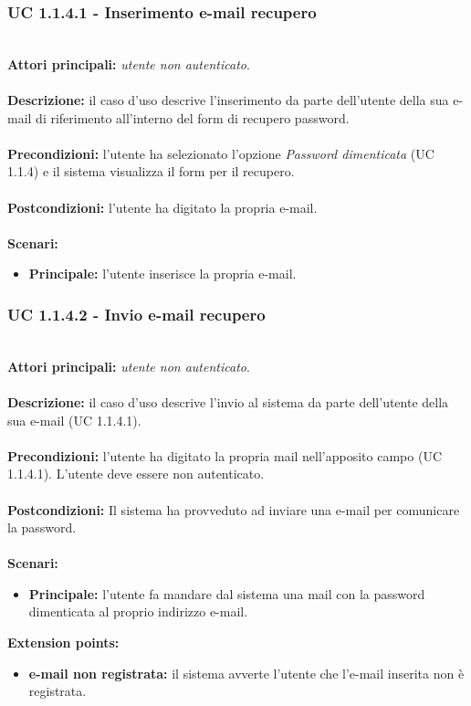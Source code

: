 \documentclass[a4paper,11pt]{article}
\begin{document}
\vspace{6 mm}

\subsubsection{UC 1.1.4.1 - Inserimento e-mail recupero}
\ \\
\textbf{Attori principali:} \textit{utente non autenticato}.\\
\\
\textbf{Descrizione:} il caso d'uso descrive l'inserimento da parte dell'utente della sua e-mail di riferimento all'interno del form di recupero password. \\
\\
\textbf{Precondizioni:} l'utente ha selezionato l'opzione \textit{Password dimenticata} (UC 1.1.4) e il sistema visualizza il form per il recupero. \\
\\
\textbf{Postcondizioni:} l'utente ha digitato la propria e-mail. \\
\\
\textbf{Scenari:}
\begin{itemize}
\item \textbf{Principale:} l'utente inserisce la propria e-mail.
\end{itemize}

\vspace{6 mm}

\subsubsection{UC 1.1.4.2 - Invio e-mail recupero}
\ \\
\textbf{Attori principali:} \textit{utente non autenticato}.\\
\\
\textbf{Descrizione:} il caso d'uso descrive l'invio al sistema da parte dell'utente della sua e-mail (UC 1.1.4.1).\\
\\
\textbf{Precondizioni:} l'utente ha digitato la propria mail nell'apposito campo (UC 1.1.4.1). L'utente deve essere non autenticato.\\
\\
\textbf{Postcondizioni:} Il sistema ha provveduto ad inviare una e-mail per comunicare la password. \\
\\
\textbf{Scenari:}
\begin{itemize}
\item \textbf{Principale:} l'utente fa mandare dal sistema una mail con la password dimenticata al proprio indirizzo e-mail.
\end{itemize}
\textbf{Extension points:}
\begin{itemize}
\item \textbf{e-mail non registrata:} il sistema avverte l'utente che l'e-mail inserita non è registrata.
\end{itemize}
\ \\
\end{document}
